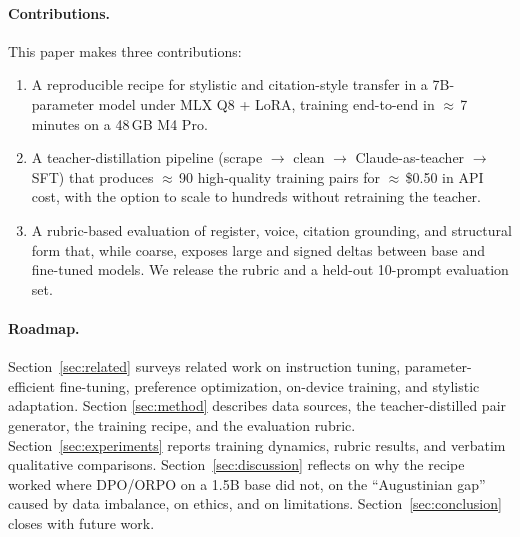 \paragraph{Contributions.} This paper makes three contributions:
\begin{enumerate}
  \item A reproducible recipe for stylistic and citation-style transfer in a
        7B-parameter model under MLX Q8 + LoRA, training end-to-end in
        $\approx$\,7 minutes on a 48\,GB M4 Pro.
  \item A teacher-distillation pipeline (scrape $\to$ clean $\to$
        Claude-as-teacher $\to$ SFT) that produces $\approx$\,90 high-quality
        training pairs for $\approx$\,\$0.50 in API cost, with the option
        to scale to hundreds without retraining the teacher.
  \item A rubric-based evaluation of register, voice, citation grounding,
        and structural form that, while coarse, exposes large and signed
        deltas between base and fine-tuned models. We release the rubric
        and a held-out 10-prompt evaluation set.
\end{enumerate}

\paragraph{Roadmap.} Section~\ref{sec:related} surveys related work on
instruction tuning, parameter-efficient fine-tuning, preference
optimization, on-device training, and stylistic adaptation. Section
\ref{sec:method} describes data sources, the teacher-distilled pair
generator, the training recipe, and the evaluation rubric.
Section~\ref{sec:experiments} reports training dynamics, rubric results, and
verbatim qualitative comparisons. Section~\ref{sec:discussion} reflects on
why the recipe worked where DPO/ORPO on a 1.5B base did not, on the
``Augustinian gap'' caused by data imbalance, on ethics, and on limitations.
Section~\ref{sec:conclusion} closes with future work.
